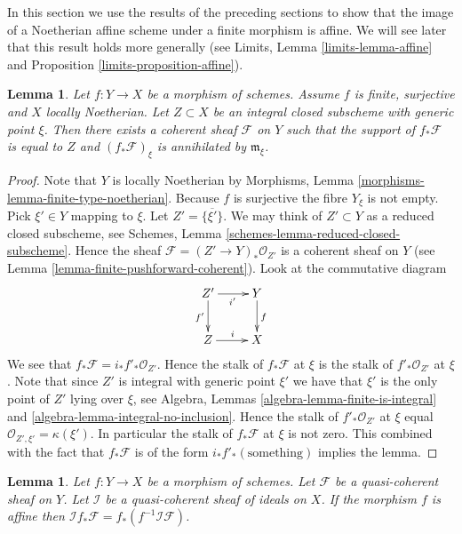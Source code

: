 \documentclass{stacks-project}
\theoremstyle{plain}
\newtheorem{lemma}[subsection]{Lemma}
\theoremstyle{definition}
\theoremstyle{remark}
\numberwithin{equation}{subsection}
\begin{document}
\noindent
In this section we use the results of the preceding sections
to show that the image of a Noetherian affine scheme under a finite
morphism is affine. We will see later that this result holds more
generally (see Limits, Lemma \ref{limits-lemma-affine} and
Proposition \ref{limits-proposition-affine}).

\begin{lemma}
\label{lemma-finite-morphism-Noetherian}
Let $f : Y \to X$ be a morphism of schemes.
Assume $f$ is finite, surjective and $X$ locally Noetherian.
Let $Z \subset X$ be an integral closed subscheme with
generic point $\xi$. Then
there exists a coherent sheaf $\mathcal{F}$ on $Y$
such that the support of $f_*\mathcal{F}$ is equal to $Z$
and $(f_*\mathcal{F})_\xi$ is annihilated by $\mathfrak m_\xi$.
\end{lemma}

\begin{proof}
Note that $Y$ is locally Noetherian by
Morphisms, Lemma \ref{morphisms-lemma-finite-type-noetherian}.
Because $f$ is surjective the fibre $Y_\xi$ is not empty.
Pick $\xi' \in Y$ mapping to $\xi$. Let $Z' = \overline{\{\xi'\}}$.
We may think of $Z' \subset Y$ as a reduced closed subscheme,
see Schemes, Lemma \ref{schemes-lemma-reduced-closed-subscheme}.
Hence the sheaf $\mathcal{F} = (Z' \to Y)_*\mathcal{O}_{Z'}$
is a coherent sheaf on $Y$ (see
Lemma \ref{lemma-finite-pushforward-coherent}).
Look at the commutative diagram
$$
\xymatrix{
Z' \ar[r]_{i'} \ar[d]_{f'} &
Y \ar[d]^f \\
Z \ar[r]^i &
X
}
$$
We see that $f_*\mathcal{F} = i_*f'_*\mathcal{O}_{Z'}$.
Hence the stalk of $f_*\mathcal{F}$ at $\xi$ is the stalk
of $f'_*\mathcal{O}_{Z'}$ at $\xi$. Note that since $Z'$ is
integral with generic point $\xi'$ we have that
$\xi'$ is the only point of $Z'$ lying over $\xi$, see
Algebra, Lemmas \ref{algebra-lemma-finite-is-integral} and
\ref{algebra-lemma-integral-no-inclusion}.
Hence the stalk of $f'_*\mathcal{O}_{Z'}$ at $\xi$
equal $\mathcal{O}_{Z', \xi'} = \kappa(\xi')$. In particular
the stalk of $f_*\mathcal{F}$ at $\xi$ is not zero.
This combined with the fact that $f_*\mathcal{F}$ is
of the form $i_*f'_*(\text{something})$ implies the lemma.
\end{proof}

\begin{lemma}
\label{lemma-affine-morphism-projection-ideal}
Let $f : Y \to X$ be a morphism of schemes.
Let $\mathcal{F}$ be a quasi-coherent sheaf on $Y$.
Let $\mathcal{I}$ be a quasi-coherent sheaf of ideals on $X$.
If the morphism $f$ is affine then
$\mathcal{I}f_*\mathcal{F} = f_*(f^{-1}\mathcal{I}\mathcal{F})$.
\end{lemma}
\end{document}

